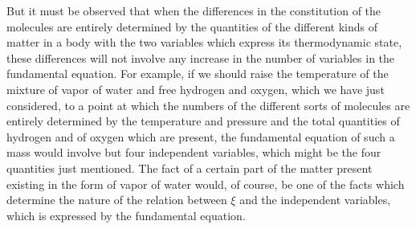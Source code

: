 \documentclass[12pt]{memoir}
\begin{document}
But it must be observed that when the differences in the constitution of the molecules are entirely determined by the quantities of the different kinds of matter in a body with the two variables which express its thermodynamic state, these differences will not involve any increase in the number of variables in the fundamental equation. For example, if we should raise the temperature of the mixture of vapor of water and free hydrogen and oxygen, which we have just considered, to a point at which the numbers of the different sorts of molecules are entirely determined by the temperature and pressure and the total quantities of hydrogen and of oxygen which are present, the fundamental equation of such a mass would involve but four independent variables, which might be the four quantities just mentioned. The fact of a certain part of the matter present existing in the form of vapor of water would, of course, be one of the facts which determine the nature of the relation between $\xi$ and the independent variables, which is expressed by the fundamental equation.
\end{document}
